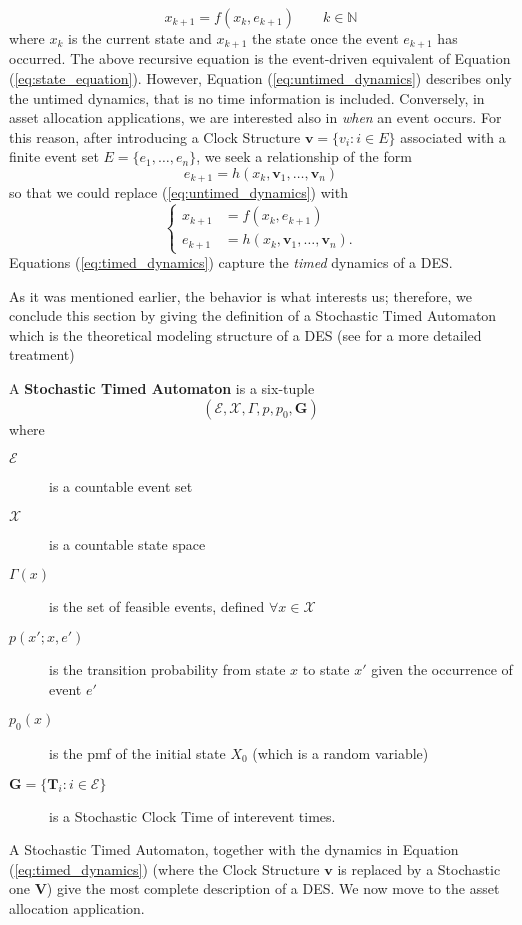 \begin{equation}\label{eq:untimed_dynamics}
x_{k+1} = f(x_k,e_{k+1}) \qquad k \in \mathbb{N}
\end{equation}
where $x_k$ is the current state and $x_{k+1}$ the state once the event $e_{k+1}$ has occurred. The above recursive equation is the event-driven equivalent of Equation (\ref{eq:state_equation}). However, Equation (\ref{eq:untimed_dynamics}) describes only the untimed dynamics, that is no time information is included. Conversely, in asset allocation applications, we are interested also in \textit{when} an event occurs. For this reason, after introducing a Clock Structure $\bm{v} = \{v_i \colon i \in E\}$ associated with a finite event set $E = \{e_1,\ldots,e_n\}$, we seek a relationship of the form \[ e_{k+1} = h(x_k,\bm{v}_1,\ldots,\bm{v}_n)\] so that we could replace (\ref{eq:untimed_dynamics}) with
\begin{equation}\label{eq:timed_dynamics}
\begin{cases}
x_{k+1} & = f(x_k,e_{k+1})\\
e_{k+1} & = h(x_k,\bm{v}_1,\ldots,\bm{v}_n).
\end{cases}
\end{equation}
Equations (\ref{eq:timed_dynamics}) capture the \textit{timed} dynamics of a \gls{DES}.

As it was mentioned earlier, the  behavior is what interests us; therefore, we conclude this section by giving the definition of a Stochastic Timed Automaton which is the theoretical modeling structure of a \gls{DES} (see \cite{cassandras2009} for a more detailed treatment)
\begin{definition}
	A \textbf{Stochastic Timed Automaton} is a six-tuple \[ (\mathcal{E},\mathcal{X},\Gamma,p,p_0,\bm{G})\]
	where 
	\begin{description}
		\item[$\mathcal{E}$] is a countable event set
		\item[$\mathcal{X}$] is a countable state space
		\item[$\Gamma(x)$] is the set of feasible events, defined $\forall x \in \mathcal{X}$
		\item[$p(x';x,e')$] is the transition probability from state $x$ to state $x'$ given the occurrence of event $e'$
		\item[$p_0(x)$] is the pmf of the initial state $X_0$ (which is a random variable)
		\item[$\bm{G}=\{\bm{T}_i \colon i \in \mathcal{E}\}$] is a Stochastic Clock Time of interevent times.
	\end{description}
\end{definition}
A Stochastic Timed Automaton, together with the dynamics in Equation (\ref{eq:timed_dynamics}) (where the Clock Structure $\bm{v}$ is replaced by a Stochastic one $\bm{V}$) give the most complete description of a \gls{DES}. We now move to the asset allocation application.
